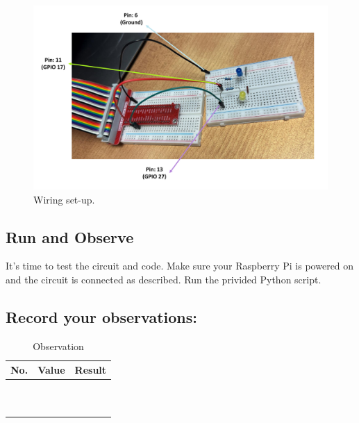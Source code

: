 \documentclass[a4paper,11pt]{article}
\begin{document}
\begin{figure}[h] %
    \centering
    \includegraphics[width=1\textwidth]{fig2.pdf} %
    \caption{Wiring set-up.}
    \label{fig:runtime1}
\end{figure}

\newpage
\subsection*{Run and Observe}
It’s time to test the circuit and code. Make sure your 
Raspberry Pi is powered on and the circuit is connected as described. 
Run the privided Python script.

\subsection*{Record your observations:}

\begin{table}[ht]
  \centering
  \renewcommand{\arraystretch}{1.5}
  \begin{tabular}{|p{1cm}|c|c|}
    \hline
    \textbf{No.} & \textbf{Value} & \textbf{Result} \\ \hline
     &  &  \\ \hline
     &  &  \\ \hline
     &  &  \\ \hline
     &  &  \\ \hline
     &  &  \\ \hline
     &  &  \\ \hline
     &  &  \\ \hline
     &  &  \\ \hline
     &  &  \\ \hline
     &  &  \\ \hline
  \end{tabular}
  \caption{Observation}
  \label{tab:empty-3x10}
\end{table}
\end{document}
